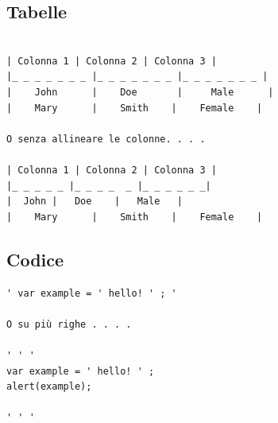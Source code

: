 \documentclass[12pt,a4paper]{article}
\begin{document}
\subsection{Tabelle}
\begin{verbatim}

| Colonna 1 | Colonna 2 | Colonna 3 |
|_ _ _ _ _ _ _ |_ _ _ _ _ _ _ |_ _ _ _ _ _ _ |
|    John      |    Doe       |     Male      |
|    Mary      |    Smith    |    Female    |

O senza allineare le colonne. . . . 

| Colonna 1 | Colonna 2 | Colonna 3 |
|_ _ _ _ _ |_ _ _ _  _ |_ _ _ _ _ _|
|  John |   Doe    |   Male   |
|    Mary      |    Smith    |    Female    |

\end{verbatim}
	
\subsection{Codice}
\begin{verbatim}
' var example = ' hello! ' ; '

O su più righe . . . .

' ' ' 
var example = ' hello! ' ; 
alert(example);

' ' '

\end{verbatim}
\end{document}
